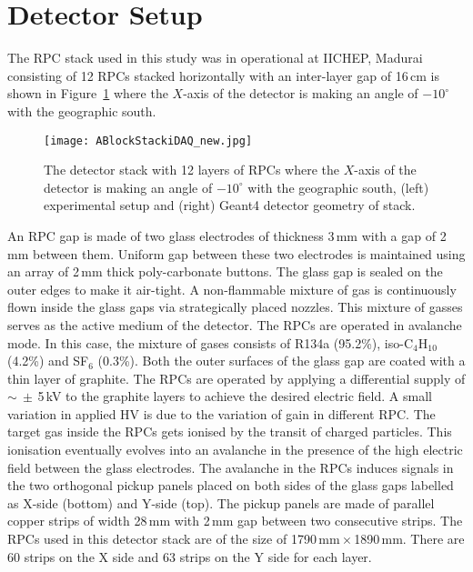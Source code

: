 \section{Detector Setup} \label{sec:detectorA}
The RPC stack used in this study was in operational at IICHEP, Madurai
  consisting of 12 RPCs
stacked horizontally with an inter-layer gap of 16\,cm is shown in
Figure~\ref{fig:stack} where the $X$-axis of the detector is making an
angle of $-10^\circ$ with the geographic south.
\begin{figure}[h]
  \centering
  \texttt{[image: ABlockStackiDAQ\_new.jpg]} 
  \caption{The detector stack with 12 layers of RPCs where the
    $X$-axis of the detector is making an angle of $-10^\circ$ with
    the geographic south, (left) experimental setup and (right) Geant4
    detector geometry of stack.}
  \label{fig:stack}
\end{figure}
An RPC gap is made of two glass electrodes of thickness 3\,mm with
a gap of 2\,mm between them. Uniform gap between these two electrodes
is maintained using an array of 2\,mm thick poly-carbonate buttons.
The glass gap is sealed on the outer edges to make it air-tight.
A non-flammable mixture of gas is continuously
flown inside the glass gaps via strategically placed nozzles.
This mixture of gasses serves as the active medium of the detector.
The RPCs are operated in avalanche mode. In this case, the mixture of
gases consists of R134a (95.2\%), iso-C$_4$H$_{10}$ (4.2\%) and
SF$_6$ (0.3\%). Both the outer surfaces of the glass gap are coated
with a thin layer of graphite. The RPCs are operated by applying
a differential supply of $\sim\:\pm$\,5\,kV to the graphite layers to
achieve the desired electric field. A small variation in applied HV is
  due to the variation of gain in different RPC. The target gas inside the RPCs gets
ionised by the transit of charged particles. This ionisation eventually
evolves into an avalanche in the presence of the high electric field
between the glass electrodes. The avalanche in the RPCs induces
signals in the two orthogonal pickup panels placed on both sides of
the glass gaps labelled as X-side (bottom) and Y-side (top). The pickup
panels are made of parallel copper strips of width 28\,mm with 2\,mm
gap between two consecutive strips. The RPCs used in this detector
stack are of the size of 1790\,mm\,$\times$\,1890\,mm. There are
60 strips on the X side and 63 strips on the Y side for each layer.

